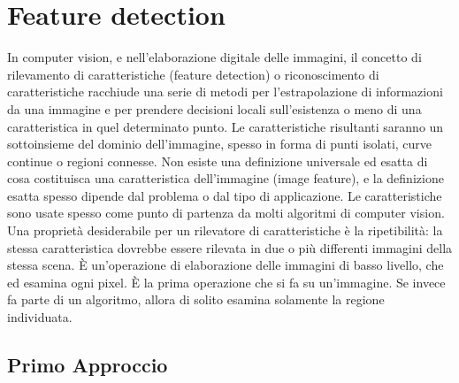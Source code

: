 \documentclass[twoside]{supsistudent}
\begin{document}
\section{Feature detection}
In computer vision, e nell'elaborazione digitale delle immagini, il concetto di rilevamento
di caratteristiche (feature detection) o riconoscimento di caratteristiche racchiude una 
serie di metodi per l'estrapolazione di informazioni da una immagine e per prendere 
decisioni locali sull'esistenza o meno di una caratteristica in quel determinato punto. 
Le caratteristiche risultanti saranno un sottoinsieme del dominio dell'immagine, spesso 
in forma di punti isolati, curve continue o regioni connesse.
Non esiste una definizione universale ed esatta di cosa costituisca una caratteristica 
dell'immagine (image feature), e la definizione esatta spesso dipende dal problema o dal 
tipo di applicazione. Le caratteristiche sono usate spesso come punto di partenza da molti 
algoritmi di computer vision.
Una proprietà desiderabile per un rilevatore di caratteristiche è la ripetibilità: 
la stessa caratteristica dovrebbe essere rilevata in due o più differenti immagini della stessa scena.
È un'operazione di elaborazione delle immagini di basso livello, che ed esamina ogni pixel. 
È la prima operazione che si fa su un'immagine. Se invece fa parte di un algoritmo, 
allora di solito esamina solamente la regione individuata.
\subsection{Primo Approccio}
\end{document}
